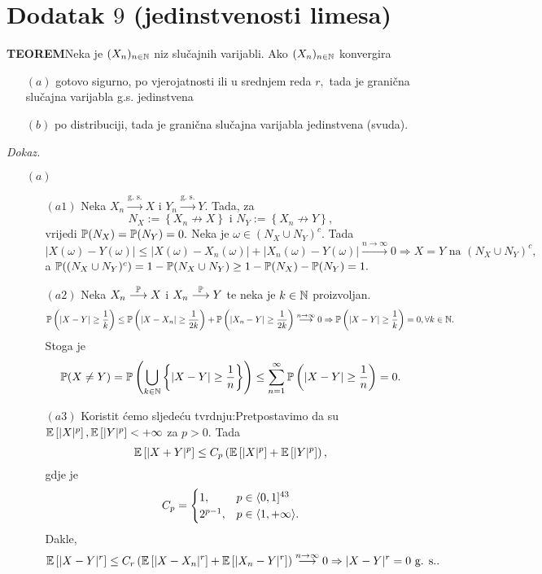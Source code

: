 \documentclass{article}
\begin{document}
\section{Dodatak \(9\) (jedinstvenosti limesa)}
\textbf{TEOREM}\newline Neka je \((X_n)_{n\in\Bbb N}\) niz slučajnih varijabli. Ako \((X_n)_{n\in\Bbb N}\) konvergira
\begin{enumerate}
    \item[\((a)\)] gotovo sigurno, po vjerojatnosti ili u srednjem reda \(r,\) tada je granična slučajna varijabla g.s. jedinstvena
    \item[\((b)\)] po distribuciji, tada je granična slučajna varijabla jedinstvena (svuda).
\end{enumerate}
\textit{Dokaz.}
\begin{enumerate}
    \item[\((a)\)]\begin{enumerate}
        \item[\((a1)\)] Neka \(X_n\overset{\text{g. s.}}{\longrightarrow}X\) i \(Y_n\overset{\text{g. s.}}{\longrightarrow}Y.\) Tada, za \[N_X:=\left\{X_n\not\longrightarrow X\right\}\text{ i }N_Y:=\left\{X_n\not\longrightarrow Y\right\},\] vrijedi \(\Bbb P(N_X)=\Bbb P(N_Y)=0.\) Neka je \(\omega\in (N_X\cup N_Y)^c.\) Tada \[|X(\omega)-Y(\omega)|\le|X(\omega)-X_n(\omega)|+|X_n(\omega)-Y(\omega)|\overset{n\to\infty}{\longrightarrow}0\Rightarrow X=Y\text{ na }(N_X\cup N_Y)^c,\] a \(\Bbb P((N_X\cup N_Y)^c)=1-\Bbb P(N_X\cup N_Y)\ge 1-\Bbb P(N_X)-\Bbb P(N_Y)=1.\)
        \item[\((a2)\)] Neka \(X_n\overset{\Bbb P}{\longrightarrow}X\) i \(X_n\overset{\Bbb P}{\longrightarrow}Y\) te neka je \(k\in\Bbb N\) proizvoljan. \[\Bbb P\left(|X-Y|\ge\frac1k\right)\le\Bbb P\left(|X-X_n|\ge\frac1{2k}\right)+\Bbb P\left(|X_n-Y|\ge\frac1{2k}\right)\overset{n\to\infty}{\longrightarrow}0\Rightarrow\Bbb P\left(|X-Y|\ge\frac1k\right)=0,\forall k\in\Bbb N.\] Stoga je \[\Bbb P(X\ne Y)=\Bbb P\left(\bigcup_{k\in\Bbb N}\left\{|X-Y|\ge\frac1n\right\}\right)\le\sum_{n=1}^\infty\Bbb P\left(|X-Y|\ge\frac1n\right)=0.\]
        \item[\((a3)\)] Koristit ćemo sljedeću tvrdnju:\newline Pretpostavimo da su \(\Bbb E\left[|X|^p\right],\Bbb E\left[|Y|^p\right]<+\infty\) za \(p>0.\) Tada \[\Bbb E\left[|X+Y|^p\right]\le C_p\left(\Bbb E\left[|X|^p\right]+\Bbb E\left[|Y|^p\right]\right),\] gdje je \[C_p=\begin{cases}1,&p\in\langle 0,1]\footnotemark[43]\\2^{p-1},&p\in\langle1,+\infty\rangle.\end{cases}\]\footnotetext[43]{Ako je \(r\in\langle0,1], t\in\langle 0,1], t^{1/r}\le t\) i \(\left(\frac{x^r}{x^r+y^r}\right)^{1/r}+\left(\frac{y^r}{x^r+y^r}\right)^{1/r}\le\frac{x^r}{x^r+y^r}+\frac{y^r}{x^r+y^r}=1\Rightarrow x+y\le(x^r+y^r)^{1/r}\Rightarrow(x+y)^r\le x^r+y^r\)} Dakle, \[\Bbb E\left[|X-Y|^r\right]\le C_r\left(\Bbb E\left[|X-X_n|^r\right]+\Bbb E\left[|X_n-Y|^r\right]\right)\overset{n\to\infty}{\longrightarrow}0\Rightarrow|X-Y|^r=0\text{ g. s.}.\]

\end{enumerate}
\end{enumerate}
\end{document}
